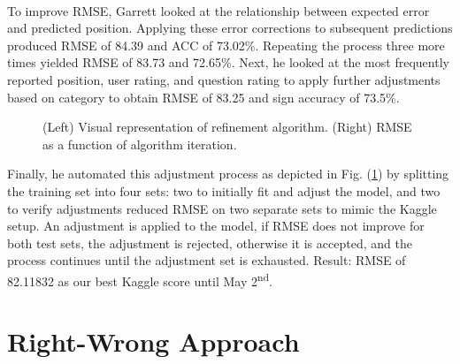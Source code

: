 \documentclass[letterpaper]{article}
\begin{document}
\paragraph{} To improve RMSE, Garrett looked at the relationship between expected error and predicted position. Applying these error corrections to subsequent predictions produced RMSE of 84.39 and ACC of 73.02\%. Repeating the process three more times yielded RMSE of 83.73 and 72.65\%. Next, he looked at the most frequently reported position, user rating, and question rating to apply further adjustments based on category to obtain RMSE of 83.25 and sign accuracy of 73.5\%.

\begin{figure}[H]
	\begin{center}
	\end{center}
	\caption{(Left) Visual representation of refinement algorithm. (Right) RMSE as a function of algorithm iteration.}
	\label{fig:expectedValue:refinement}
\end{figure}

Finally, he automated this adjustment process as depicted in Fig. (\ref{fig:expectedValue:refinement}) by splitting the training set into four sets: two to initially fit and adjust the model, and two to verify adjustments reduced RMSE on two separate sets to mimic the Kaggle setup. An adjustment is applied to the model, if RMSE does not improve for both test sets, the adjustment is rejected, otherwise it is accepted, and the process continues until the adjustment set is exhausted. Result: RMSE of 82.11832 as our best Kaggle score until May 2\textsuperscript{nd}.

\section*{Right-Wrong Approach}
\end{document}
